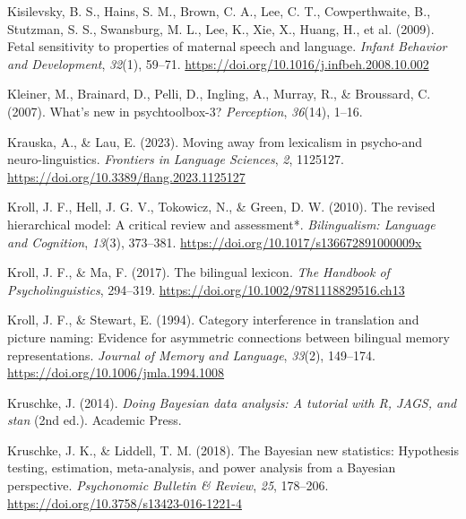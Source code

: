 \documentclass[
  12pt,
  b5paperpaper,
  twoside]{scrreprt}
\newlength{\cslhangindent}
\newlength{\cslentryspacingunit} %
\newenvironment{CSLReferences}[2] %
 {%
  \setlength{\parindent}{0pt}
  \ifodd #1
  \let\oldpar\par
  \def\par{\hangindent=\cslhangindent\oldpar}
  \fi
  \setlength{\parskip}{#2\cslentryspacingunit}
 }%
 {}
\begin{document}
\begin{CSLReferences}{1}{0}
\leavevmode{}%
Kisilevsky, B. S., Hains, S. M., Brown, C. A., Lee, C. T.,
Cowperthwaite, B., Stutzman, S. S., Swansburg, M. L., Lee, K., Xie, X.,
Huang, H., et al. (2009). Fetal sensitivity to properties of maternal
speech and language. \emph{Infant Behavior and Development},
\emph{32}(1), 59--71. \url{https://doi.org/10.1016/j.infbeh.2008.10.002}

\leavevmode{}%
Kleiner, M., Brainard, D., Pelli, D., Ingling, A., Murray, R., \&
Broussard, C. (2007). What's new in psychtoolbox-3? \emph{Perception},
\emph{36}(14), 1--16.

\leavevmode{}%
Krauska, A., \& Lau, E. (2023). Moving away from lexicalism in
psycho-and neuro-linguistics. \emph{Frontiers in Language Sciences},
\emph{2}, 1125127. \url{https://doi.org/10.3389/flang.2023.1125127}

\leavevmode{}%
Kroll, J. F., Hell, J. G. V., Tokowicz, N., \& Green, D. W. (2010). The
revised hierarchical model: A critical review and assessment*.
\emph{Bilingualism: Language and Cognition}, \emph{13}(3), 373--381.
\url{https://doi.org/10.1017/s136672891000009x}

\leavevmode{}%
Kroll, J. F., \& Ma, F. (2017). The bilingual lexicon. \emph{The
Handbook of Psycholinguistics}, 294--319.
\url{https://doi.org/10.1002/9781118829516.ch13}

\leavevmode{}%
Kroll, J. F., \& Stewart, E. (1994). Category interference in
translation and picture naming: Evidence for asymmetric connections
between bilingual memory representations. \emph{Journal of Memory and
Language}, \emph{33}(2), 149--174.
\url{https://doi.org/10.1006/jmla.1994.1008}

\leavevmode{}%
Kruschke, J. (2014). \emph{Doing {Bayesian} data analysis: A tutorial
with {R}, {JAGS}, and stan} (2nd ed.). {Academic Press}.

\leavevmode{}%
Kruschke, J. K., \& Liddell, T. M. (2018). The {Bayesian} new
statistics: Hypothesis testing, estimation, meta-analysis, and power
analysis from a {Bayesian} perspective. \emph{Psychonomic Bulletin \&
Review}, \emph{25}, 178--206.
\url{https://doi.org/10.3758/s13423-016-1221-4}


\end{CSLReferences}
\end{document}
